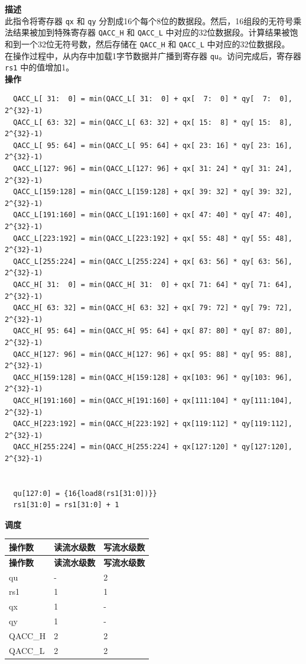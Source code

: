 \textbf{描述}\\
此指令将寄存器 \lstinline{qx} 和 \lstinline{qy} 分割成16个每个8位的数据段。然后，16组段的无符号乘法结果被加到特殊寄存器 \lstinline{QACC_H} 和 \lstinline{QACC_L} 中对应的32位数据段。计算结果被饱和到一个32位无符号数，然后存储在 \lstinline{QACC_H} 和 \lstinline{QACC_L} 中对应的32位数据段。\\
在操作过程中，从内存中加载1字节数据并广播到寄存器 \lstinline{qu}。访问完成后，寄存器 \lstinline{rs1} 中的值增加1。\\
\textbf{操作}
\begin{lstlisting}
  QACC_L[ 31:  0] = min(QACC_L[ 31:  0] + qx[  7:  0] * qy[  7:  0], 2^{32}-1)
  QACC_L[ 63: 32] = min(QACC_L[ 63: 32] + qx[ 15:  8] * qy[ 15:  8], 2^{32}-1)
  QACC_L[ 95: 64] = min(QACC_L[ 95: 64] + qx[ 23: 16] * qy[ 23: 16], 2^{32}-1)
  QACC_L[127: 96] = min(QACC_L[127: 96] + qx[ 31: 24] * qy[ 31: 24], 2^{32}-1)
  QACC_L[159:128] = min(QACC_L[159:128] + qx[ 39: 32] * qy[ 39: 32], 2^{32}-1)
  QACC_L[191:160] = min(QACC_L[191:160] + qx[ 47: 40] * qy[ 47: 40], 2^{32}-1)
  QACC_L[223:192] = min(QACC_L[223:192] + qx[ 55: 48] * qy[ 55: 48], 2^{32}-1)
  QACC_L[255:224] = min(QACC_L[255:224] + qx[ 63: 56] * qy[ 63: 56], 2^{32}-1)
  QACC_H[ 31:  0] = min(QACC_H[ 31:  0] + qx[ 71: 64] * qy[ 71: 64], 2^{32}-1)
  QACC_H[ 63: 32] = min(QACC_H[ 63: 32] + qx[ 79: 72] * qy[ 79: 72], 2^{32}-1)
  QACC_H[ 95: 64] = min(QACC_H[ 95: 64] + qx[ 87: 80] * qy[ 87: 80], 2^{32}-1)
  QACC_H[127: 96] = min(QACC_H[127: 96] + qx[ 95: 88] * qy[ 95: 88], 2^{32}-1)
  QACC_H[159:128] = min(QACC_H[159:128] + qx[103: 96] * qy[103: 96], 2^{32}-1)
  QACC_H[191:160] = min(QACC_H[191:160] + qx[111:104] * qy[111:104], 2^{32}-1)
  QACC_H[223:192] = min(QACC_H[223:192] + qx[119:112] * qy[119:112], 2^{32}-1)
  QACC_H[255:224] = min(QACC_H[255:224] + qx[127:120] * qy[127:120], 2^{32}-1)


  qu[127:0] = {16{load8(rs1[31:0])}}
  rs1[31:0] = rs1[31:0] + 1
\end{lstlisting}

\textbf{调度}\\
\begin{longtable}[c]{|l|l|l|}
    \hline
    \rowcolor{lightgray}
    \textbf{操作数} & \textbf{读流水级数} & \textbf{写流水级数} \\\hline
    \endfirsthead
    \hline
    \rowcolor{lightgray}
     \textbf{操作数} & \textbf{读流水级数} & \textbf{写流水级数} \\\hline
    \endhead
    \hline
    \endfoot

    qu & - & 2 \\\hline
    rs1 & 1 & 1 \\\hline
     qx & 1 & - \\\hline
     qy & 1 & - \\\hline
     QACC\_H & 2 & 2 \\\hline
     QACC\_L & 2 & 2

\end{longtable}

